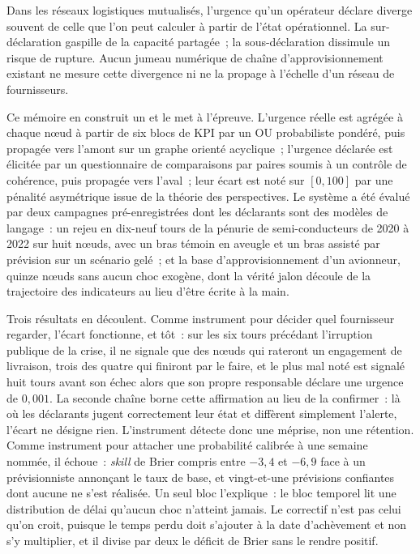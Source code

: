 Dans les r\'eseaux logistiques mutualis\'es, l'urgence qu'un op\'erateur d\'eclare diverge
souvent de celle que l'on peut calculer \`a partir de l'\'etat op\'erationnel. La
sur-d\'eclaration gaspille de la capacit\'e partag\'ee~; la sous-d\'eclaration dissimule un
risque de rupture. Aucun jumeau num\'erique de cha\^ine d'approvisionnement existant ne
mesure cette divergence ni ne la propage \`a l'\'echelle d'un r\'eseau de fournisseurs.

Ce m\'emoire en construit un et le met \`a l'\'epreuve. L'urgence r\'eelle est agr\'eg\'ee \`a
chaque n\oe{}ud \`a partir de six blocs de KPI par un OU probabiliste pond\'er\'e, puis
propag\'ee vers l'amont sur un graphe orient\'e acyclique~; l'urgence d\'eclar\'ee est
\'elicit\'ee par un questionnaire de comparaisons par paires soumis \`a un contr\^ole de
coh\'erence, puis propag\'ee vers l'aval~; leur \'ecart est not\'e sur $[0,100]$ par une
p\'enalit\'e asym\'etrique issue de la th\'eorie des perspectives. Le syst\`eme a \'et\'e
\'evalu\'e par deux campagnes pr\'e-enregistr\'ees dont les d\'eclarants sont des mod\`eles de
langage~: un rejeu en dix-neuf tours de la p\'enurie de semi-conducteurs de 2020 \`a 2022 sur
huit n\oe{}uds, avec un bras t\'emoin en aveugle et un bras assist\'e par pr\'evision sur un
sc\'enario gel\'e~; et la base d'approvisionnement d'un avionneur, quinze n\oe{}uds sans
aucun choc exog\`ene, dont la v\'erit\'e jalon d\'ecoule de la trajectoire des indicateurs au
lieu d'\^etre \'ecrite \`a la main.

Trois r\'esultats en d\'ecoulent. Comme instrument pour d\'ecider quel fournisseur regarder,
l'\'ecart fonctionne, et t\^ot~: sur les six tours pr\'ec\'edant l'irruption publique de la
crise, il ne signale que des n\oe{}uds qui rateront un engagement de livraison, trois des
quatre qui finiront par le faire, et le plus mal not\'e est signal\'e huit tours avant son
\'echec alors que son propre responsable d\'eclare une urgence de $0{,}001$. La seconde
cha\^ine borne cette affirmation au lieu de la confirmer~: l\`a o\`u les d\'eclarants jugent
correctement leur \'etat et diff\`erent simplement l'alerte, l'\'ecart ne d\'esigne rien.
L'instrument d\'etecte donc une m\'eprise, non une r\'etention. Comme instrument pour
attacher une probabilit\'e calibr\'ee \`a une semaine nomm\'ee, il \'echoue~: \emph{skill} de
Brier compris entre $-3{,}4$ et $-6{,}9$ face \`a un pr\'evisionniste annon\c{c}ant le taux de
base, et vingt-et-une pr\'evisions confiantes dont aucune ne s'est r\'ealis\'ee. Un seul bloc
l'explique~: le bloc temporel lit une distribution de d\'elai qu'aucun choc n'atteint jamais.
Le correctif n'est pas celui qu'on croit, puisque le temps perdu doit s'ajouter \`a la date
d'ach\`evement et non s'y multiplier, et il divise par deux le d\'eficit de Brier sans le
rendre positif.

